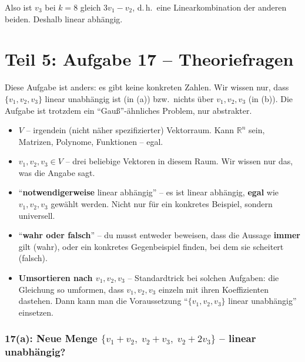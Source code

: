 \documentclass[a4paper,12pt]{article}
\begin{document}
Also ist $v_3$ bei $k=8$ gleich $3v_1 - v_2$, d.\,h.\ eine Linearkombination der anderen beiden. Deshalb linear abh\"angig.

\newpage

\part*{Teil 5: Aufgabe 17 -- Theoriefragen}

Diese Aufgabe ist anders: es gibt keine konkreten Zahlen. Wir wissen nur, dass $\{v_1, v_2, v_3\}$ linear unabh\"angig ist (in (a)) bzw.\ nichts \"uber $v_1, v_2, v_3$ (in (b)). Die Aufgabe ist trotzdem ein ``Gau\ss''-\"ahnliches Problem, nur abstrakter.

\begin{begriffe}
\begin{itemize}[leftmargin=*, nosep]
    \item $V$ -- irgendein (nicht n\"aher spezifizierter) Vektorraum. Kann $\mathbb{R}^n$ sein, Matrizen, Polynome, Funktionen -- egal.
    \item $v_1, v_2, v_3 \in V$ -- drei beliebige Vektoren in diesem Raum. Wir wissen nur das, was die Angabe sagt.
    \item ``\textbf{notwendigerweise} linear abh\"angig'' -- es ist linear abh\"angig, \textbf{egal} wie $v_1, v_2, v_3$ gew\"ahlt werden. Nicht nur f\"ur ein konkretes Beispiel, sondern universell.
    \item ``\textbf{wahr oder falsch}'' -- du musst entweder beweisen, dass die Aussage \textbf{immer} gilt (wahr), oder ein konkretes Gegenbeispiel finden, bei dem sie scheitert (falsch).
    \item \textbf{Umsortieren nach $v_1, v_2, v_3$} -- Standardtrick bei solchen Aufgaben: die Gleichung so umformen, dass $v_1, v_2, v_3$ einzeln mit ihren Koeffizienten dastehen. Dann kann man die Voraussetzung ``$\{v_1, v_2, v_3\}$ linear unabh\"angig'' einsetzen.
\end{itemize}
\end{begriffe}

\section*{17(a): Neue Menge $\{v_1+v_2,\; v_2+v_3,\; v_2+2v_3\}$ -- linear unabh\"angig?}
\end{document}
